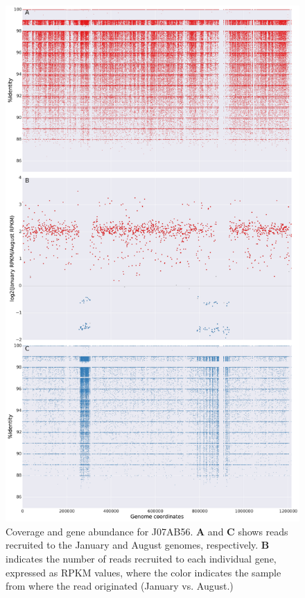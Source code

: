 \begin{figure}[!hbtp]
  \centering
  \includegraphics[width=\textwidth,height=0.8\textheight,keepaspectratio]{Chapter5/Figures/coverage_plots/J07AB56_coverage.pdf}
  \caption{Coverage and gene abundance for J07AB56. \textbf{A} and \textbf{C} shows reads recruited to the January and August genomes, respectively. \textbf{B} indicates the number of reads recruited to each individual gene, expressed as RPKM values, where the color indicates the sample from where the read originated (January vs. August.)}
  \label{J07AB56coverage}
\end{figure}

